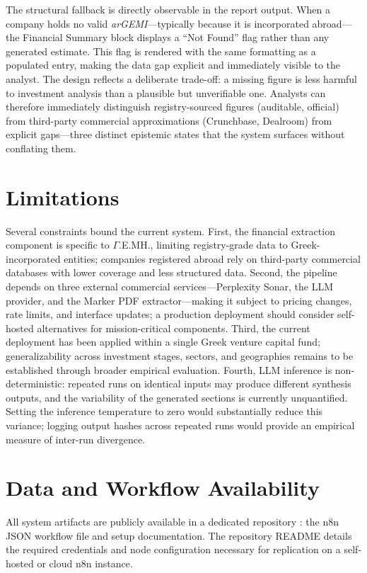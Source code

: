 \documentclass[12pt]{article}
\begin{document}
The structural fallback is directly observable in the report output. When a company holds no valid
\textit{arGEMI}---typically because it is incorporated abroad---the Financial Summary block
displays a ``Not Found'' flag rather than any generated estimate. This flag is rendered with the
same formatting as a populated entry, making the data gap explicit and immediately visible to the
analyst. The design reflects a deliberate trade-off: a missing figure is less harmful to
investment analysis than a plausible but unverifiable one. Analysts can therefore immediately
distinguish registry-sourced figures (auditable, official) from third-party commercial
approximations (Crunchbase, Dealroom) from explicit gaps---three distinct epistemic states that the system
surfaces without conflating them.

\section{Limitations}
\label{sec:limitations}

Several constraints bound the current system. First, the financial extraction component is
specific to $\Gamma$.E.MH., limiting registry-grade data to Greek-incorporated entities; companies
registered abroad rely on third-party commercial databases with lower coverage and less structured data.
Second, the pipeline depends on three external commercial services---Perplexity Sonar, the LLM
provider, and the Marker PDF extractor---making it subject to pricing changes, rate limits, and
interface updates; a production deployment should consider self-hosted alternatives for
mission-critical components. Third, the current deployment has been applied within a single Greek venture capital fund;
generalizability across investment stages, sectors, and geographies remains to be established
through broader empirical evaluation. Fourth,
LLM inference is non-deterministic: repeated runs on identical inputs may produce different
synthesis outputs, and the variability of the generated sections is currently unquantified.
Setting the inference temperature to zero would substantially reduce this variance; logging
output hashes across repeated runs would provide an empirical measure of inter-run divergence.

\section{Data and Workflow Availability}
\label{sec:data}

All system artifacts are publicly available in a dedicated repository
\parencite{alexandrou2026due}: the n8n JSON workflow file and setup documentation. The repository
README details the required credentials and node configuration necessary for replication on a
self-hosted or cloud n8n instance.
\end{document}

